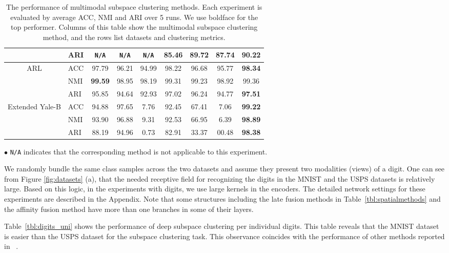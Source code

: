\documentclass[journal]{IEEEtran}
\begin{document}
\begin{table*}[t!]
\begin{center}
{\begin{tabular}{|c|l|c|c|c|c|c|c|c|}
      \cline{2-9}
            &ARI	 &	\texttt{\scriptsize{N/A}} 	& 	\texttt{\scriptsize{N/A}}    &   \texttt{\scriptsize{N/A}} 	& 	85.46  &	89.72 	& 	87.74   &    \textbf{90.22}	 \\
\hline\hline
\multirow{3}{*}{ARL}
        &   ACC   &  97.79  &  96.21  &  94.99  &  98.22  &  96.68  &  95.77  &  \textbf{98.34}  \\
      \cline{2-9}
      &NMI	 &	\textbf{99.59} 	& 98.95	   &    98.19	& 	99.31  &	99.23 	& 	98.92   &    99.36	   \\\cline{2-9}
            &ARI	 &	95.85 	& 	  94.64	& 	92.93  &	  97.02 	& 	96.24 	& 	94.77   &    \textbf{97.51} \\
\hline\hline
\multirow{3}{*}{Extended Yale-B}
        &   ACC   &  94.88  &  97.65  &  7.76  &  92.45  &  67.41  &  7.06  &  \textbf{99.22}  \\ \cline{2-9}
      &NMI	 &	93.90 	& 	96.88    &   9.31	& 	92.53  &	66.95	& 	6.39   &    \textbf{98.89}	   \\
      \cline{2-9}
            &ARI	 &	88.19	& 	94.96   &    0.73	& 	82.91  &	33.37 	& 	00.48   &   \textbf{98.38}	 \\
\hline
\end{tabular}
}
\tiny{$\bullet$ \texttt{\scriptsize{N/A}} indicates that the corresponding method is not applicable to this experiment.}\hfill 
\caption{The performance of multimodal subspace clustering methods.		Each experiment is evaluated by average ACC,  NMI and ARI over 5 runs. We use boldface for the top performer. Columns of this table show the multimodal subspace clustering method, and the rows list datasets and clustering metrics. } \label{tbl:multi}
\end{center}
\end{table*}


We randomly bundle the same class samples across the two datasets and assume they present two modalities (views) of a digit.		One can see from Figure \ref{fig:datasets} (a), that the needed receptive field for recognizing the digits in the MNIST and the USPS datasets is relatively large.		  Based on this logic, in the experiments with digits, we use large kernels in the encoders.		The detailed network settings for these experiments are described in the Appendix.  Note that some structures including the late fusion methods in Table~\ref{tbl:spatialmethods} and the affinity fusion method  have more than one branches in some of their layers.  
		

Table~\ref{tbl:digits_uni} shows the performance of deep subspace clustering per individual digits.		  This table reveals that the MNIST dataset is easier than the USPS dataset for the subspace clustering task.		 This observance coincides with the performance of other methods reported in ~\cite{guo2017deep}.		
\end{document}
